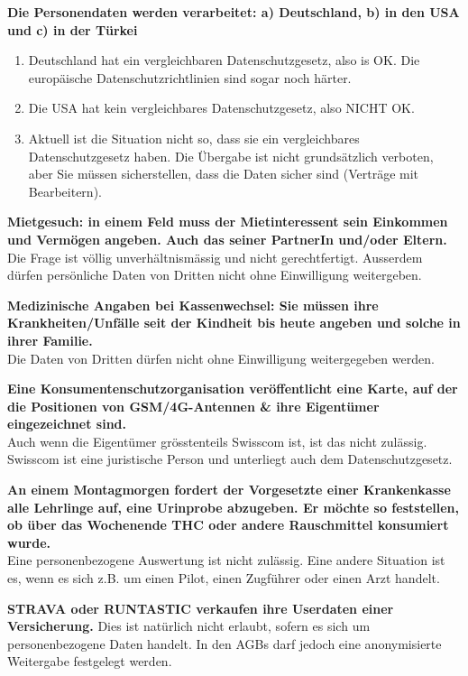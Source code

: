 \textbf{Die Personendaten werden verarbeitet: a) Deutschland, b) in den
USA und c) in der Türkei}

\begin{enumerate}
\def\labelenumi{\alph{enumi})}
\item
  Deutschland hat ein vergleichbaren Datenschutzgesetz, also is OK. Die
  europäische Datenschutzrichtlinien sind sogar noch härter.
\item
  Die USA hat kein vergleichbares Datenschutzgesetz, also NICHT OK.
\item
  Aktuell ist die Situation nicht so, dass sie ein vergleichbares
  Datenschutzgesetz haben. Die Übergabe ist nicht grundsätzlich
  verboten, aber Sie müssen sicherstellen, dass die Daten sicher sind
  (Verträge mit Bearbeitern).
\end{enumerate}

\textbf{Mietgesuch: in einem Feld muss der Mietinteressent sein
Einkommen und Vermögen angeben. Auch das seiner PartnerIn und/oder
Eltern.}\\
Die Frage ist völlig unverhältnismässig und nicht gerechtfertigt.
Ausserdem dürfen persönliche Daten von Dritten nicht ohne Einwilligung
weitergeben.

\textbf{Medizinische Angaben bei Kassenwechsel: Sie müssen ihre
Krankheiten/Unfälle seit der Kindheit bis heute angeben und solche in
ihrer Familie.}\\
Die Daten von Dritten dürfen nicht ohne Einwilligung weitergegeben
werden.

\textbf{Eine Konsumentenschutzorganisation veröffentlicht eine Karte,
auf der die Positionen von GSM/4G-Antennen \& ihre Eigentümer
eingezeichnet sind.}\\
Auch wenn die Eigentümer grösstenteils Swisscom ist, ist das nicht
zulässig. Swisscom ist eine juristische Person und unterliegt auch dem
Datenschutzgesetz.

\textbf{An einem Montagmorgen fordert der Vorgesetzte einer Krankenkasse
alle Lehrlinge auf, eine Urinprobe abzugeben. Er möchte so feststellen,
ob über das Wochenende THC oder andere Rauschmittel konsumiert wurde.}\\
Eine personenbezogene Auswertung ist nicht zulässig. Eine andere
Situation ist es, wenn es sich z.B. um einen Pilot, einen Zugführer oder
einen Arzt handelt.

\textbf{STRAVA oder RUNTASTIC verkaufen ihre Userdaten einer
Versicherung.} Dies ist natürlich nicht erlaubt, sofern es sich um
personenbezogene Daten handelt. In den AGBs darf jedoch eine
anonymisierte Weitergabe festgelegt werden.

